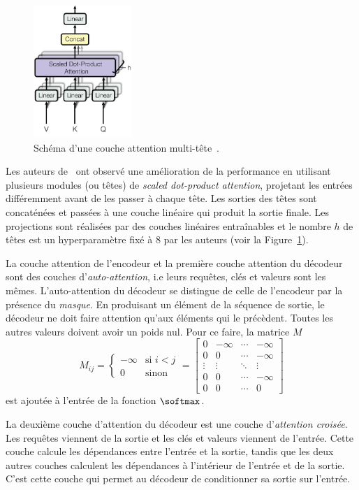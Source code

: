 \begin{figure}[hbt]
    \centering
    \includegraphics[height=5cm]{assets/images/multihead-attention.png}
    \caption[Schéma d'une couche attention multitête.]
    {Schéma d'une couche attention multi-tête~\cite{attention}.}
    \label{fig.multihead-attention}
\end{figure}

Les auteurs de~\cite{attention} ont observé une amélioration de la performance 
en utilisant plusieurs modules (ou têtes) de \emph{\foreignlanguage{english}{scaled dot-product attention}},
projetant les entrées différemment avant de les passer à chaque tête.
Les sorties des têtes sont concaténées et passées à une couche linéaire qui produit la sortie finale.
Les projections sont réalisées par des couches linéaires entraînables et le nombre \(h\) de têtes est un hyperparamètre fixé à \(8\) par les auteurs (voir la Figure~\ref{fig.multihead-attention}).

La couche attention de l'encodeur et la première couche attention du décodeur sont des couches
d'\emph{auto-attention}, i.e leurs requêtes, clés et valeurs sont les mêmes.
L'auto-attention du décodeur se distingue de celle de l'encodeur par la présence du \emph{masque}.
En produisant un élément de la séquence de sortie, le décodeur ne doit faire attention qu'aux éléments
qui le précèdent.
Toutes les autres valeurs doivent avoir un poids nul.
Pour ce faire, la matrice \(M\) 
\begin{equation}
    M_{ij} = \begin{cases}
        -\infty & \text{si } i < j \\
        0       & \text{sinon}
    \end{cases} 
    = \begin{bmatrix}
        0       & -\infty & \cdots & -\infty \\
        0       & 0       & \cdots & -\infty \\
        \vdots  & \vdots  & \ddots & \vdots  \\
        0       & 0       & \cdots & -\infty \\
        0       & 0       & \cdots & 0
    \end{bmatrix}
\end{equation}
est ajoutée à l'entrée de la fonction \(\softmax\).

La deuxième couche d'attention du décodeur est une couche d'\emph{attention croisée}.
Les requêtes viennent de la sortie et les clés et valeurs viennent de l'entrée.
Cette couche calcule les dépendances entre l'entrée et la sortie,
tandis que les deux autres couches calculent les dépendances à l'intérieur de l'entrée et de la sortie.
C'est cette couche qui permet au décodeur de conditionner sa sortie sur l'entrée.


